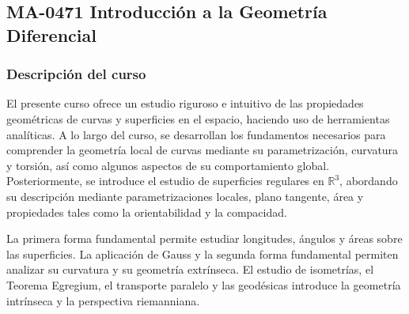 
\newpage
\subsection*{MA-0471 Introducción a la Geometría Diferencial}

\hypertarget{MA0471}{}
\begin{refsection}
\begin{table}[H]
\end{table}



\subsubsection*{Descripción del curso}

El presente curso ofrece un estudio riguroso e intuitivo de las propiedades geométricas de curvas y superficies en el espacio, haciendo uso de herramientas analíticas. A lo largo del curso, se desarrollan los fundamentos necesarios para comprender la geometría local de curvas mediante su parametrización, curvatura y torsión, así como algunos aspectos de su comportamiento global. Posteriormente, se introduce el estudio de superficies regulares en $\mathbb{R}^3$, abordando su descripción mediante parametrizaciones locales, plano tangente, área y propiedades tales como la orientabilidad y la compacidad.

La primera forma fundamental permite estudiar longitudes, ángulos y áreas sobre las superficies. La aplicación de Gauss y la segunda forma fundamental permiten analizar su curvatura y su geometría extrínseca. El estudio de isometrías, el Teorema Egregium, el transporte paralelo y las geodésicas introduce la geometría intrínseca y la perspectiva riemanniana.


\end{refsection}
